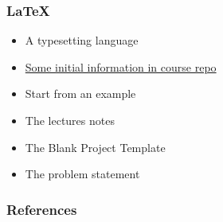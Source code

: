 \documentclass[t,12pt,numbers,fleqn]{beamer}
\begin{document}

\begin{frame}
\frametitle{LaTeX}
\begin{itemize}
\item A typesetting language
\item \href{https://gitlab.cas.mcmaster.ca/smiths/cas741/tree/master/ToolTutorials/LaTeX}{Some initial information in course repo}
\item Start from an example
\bi
\item The lectures notes
\item The Blank Project Template
\item The problem statement
\ei
\end{itemize}
\end{frame}


\begin{frame}[allowframebreaks]
\frametitle{References}



\end{frame}

\end{document}
